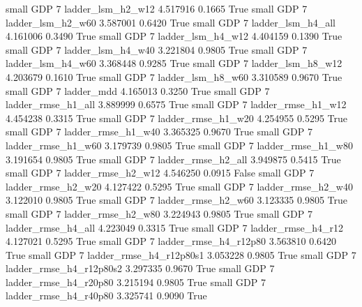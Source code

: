      small      GDP                 7        ladder_lsm_h2_w12   4.517916      0.1665    True
     small      GDP                 7        ladder_lsm_h2_w60   3.587001      0.6420    True
     small      GDP                 7        ladder_lsm_h4_all   4.161006      0.3490    True
     small      GDP                 7        ladder_lsm_h4_w12   4.404159      0.1390    True
     small      GDP                 7        ladder_lsm_h4_w40   3.221804      0.9805    True
     small      GDP                 7        ladder_lsm_h4_w60   3.368448      0.9285    True
     small      GDP                 7        ladder_lsm_h8_w12   4.203679      0.1610    True
     small      GDP                 7        ladder_lsm_h8_w60   3.310589      0.9670    True
     small      GDP                 7               ladder_mdd   4.165013      0.3250    True
     small      GDP                 7       ladder_rmse_h1_all   3.889999      0.6575    True
     small      GDP                 7       ladder_rmse_h1_w12   4.454238      0.3315    True
     small      GDP                 7       ladder_rmse_h1_w20   4.254955      0.5295    True
     small      GDP                 7       ladder_rmse_h1_w40   3.365325      0.9670    True
     small      GDP                 7       ladder_rmse_h1_w60   3.179739      0.9805    True
     small      GDP                 7       ladder_rmse_h1_w80   3.191654      0.9805    True
     small      GDP                 7       ladder_rmse_h2_all   3.949875      0.5415    True
     small      GDP                 7       ladder_rmse_h2_w12   4.546250      0.0915   False
     small      GDP                 7       ladder_rmse_h2_w20   4.127422      0.5295    True
     small      GDP                 7       ladder_rmse_h2_w40   3.122010      0.9805    True
     small      GDP                 7       ladder_rmse_h2_w60   3.123335      0.9805    True
     small      GDP                 7       ladder_rmse_h2_w80   3.224943      0.9805    True
     small      GDP                 7       ladder_rmse_h4_all   4.223049      0.3315    True
     small      GDP                 7       ladder_rmse_h4_r12   4.127021      0.5295    True
     small      GDP                 7    ladder_rmse_h4_r12p80   3.563810      0.6420    True
     small      GDP                 7  ladder_rmse_h4_r12p80s1   3.053228      0.9805    True
     small      GDP                 7  ladder_rmse_h4_r12p80s2   3.297335      0.9670    True
     small      GDP                 7    ladder_rmse_h4_r20p80   3.215194      0.9805    True
     small      GDP                 7    ladder_rmse_h4_r40p80   3.325741      0.9090    True
